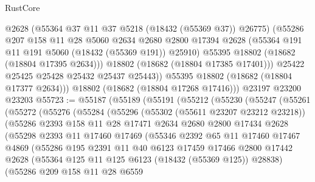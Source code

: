 \begin{lexlean}{RustCore}
\begin{coremodule}
              @2628
              (@55364 @37 @11 @37 @5218 (@18432 (@55369 @37)) @26775)
              (@55286
                @207
                @158
                @11
                @28
                @5060
                @2634
                @2680
                @2800
                @17394
                @2628
                (@55364 @191 @11 @191 @5060 (@18432 (@55369 @191)) @25910)
                @55395
                @18802
                (@18682 (@18804 @17395 @2634)))
              @18802
              (@18682 (@18804 @17385 @17401)))
            @25422
            @25425
            @25428
            @25432
            @25437
            @25443))
        @55395
        @18802
        (@18682 (@18804 @17377 @2634)))
      @18802
      (@18682 (@18804 @17268 @17416)))
    @23197
    @23200
    @23203
@55723 := @55187
    (@55189
      (@55191
        (@55212
          (@55230
            (@55247
              (@55261
                (@55272
                  (@55276
                    (@55284
                      (@55296
                        (@55302 (@55611 @23207 @23212 @23218))
                        (@55286
                          @2393
                          @158
                          @11
                          @28
                          @17471
                          @2634
                          @2680
                          @2800
                          @17434
                          @2628
                          (@55298
                            @2393
                            @11
                            @17460
                            @17469
                            (@55346
                              @2392
                              @65
                              @11
                              @17460
                              @17467
                              @4869
                              (@55286
                                @195
                                @2391
                                @11
                                @40
                                @6123
                                @17459
                                @17466
                                @2800
                                @17442
                                @2628
                                (@55364 @125 @11 @125 @6123 (@18432 (@55369 @125)) @28838)
                                (@55286
                                  @209
                                  @158
                                  @11
                                  @28
                                  @6559

\end{coremodule}
\end{lexlean}
